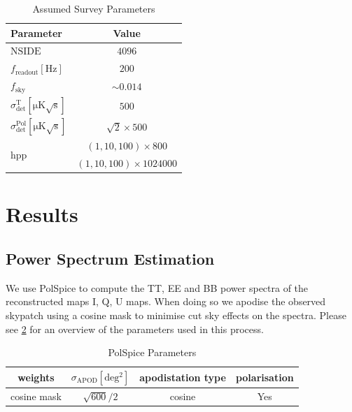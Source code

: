 \documentclass[apj]{emulateapj}
\begin{document}
\begin{table}[tbh] %
\begin{center}
\caption{\label{tab:modelparams} Assumed Survey Parameters}
\small
\begin{tabular}{l | c}
Parameter & Value\\
\hline
$\mathrm{NSIDE}$ &$4096$\\
$f_{\mathrm{readout}} [\mathrm{Hz}]$ &$200$\\
$f_{{\mathrm{sky}}}$ & $\sim 0.014$\\
$\sigma^{\mathrm{T}}_{\mathrm{det}} [\mathrm{\mu K \sqrt{s}}]$ &$500$\\
$\sigma^{\mathrm{Pol}}_{\mathrm{det}} [\mathrm{\mu K \sqrt{s}}]$ & $\sqrt{2}\times500$\\
\multirow{2}{*}{$\mathrm{hpp}$} & $\left(1, 10, 100 \right) \times 800$\\
& $\left( 1, 10, 100 \right) \times 1024000$ \\
\end{tabular}
 \normalsize
\end{center}
\end{table}



\section{Results}
\label{sec:results}

\subsection{Power Spectrum Estimation}
\label{subsec:psestimation}

We use PolSpice to compute the TT, EE and BB power spectra of the reconstructed maps I, Q, U maps. When doing so we apodise the observed skypatch using a cosine mask to minimise cut sky effects on the spectra. Please see \ref{tab:polspiceparams} for an overview of the parameters used in this process.

\begin{table}[tbh]
\begin{center}
\caption{\label{tab:polspiceparams} PolSpice Parameters}
\small
\begin{tabular}{c c c c}
weights & $\sigma_{\mathrm{APOD}} [\mathrm{deg^2}]$ & apodistation type & polarisation \\
\hline
cosine mask & $\sqrt{600}/2$ & cosine & Yes \\

\end{tabular}
 \normalsize
\end{center}
\end{table}
\end{document}
